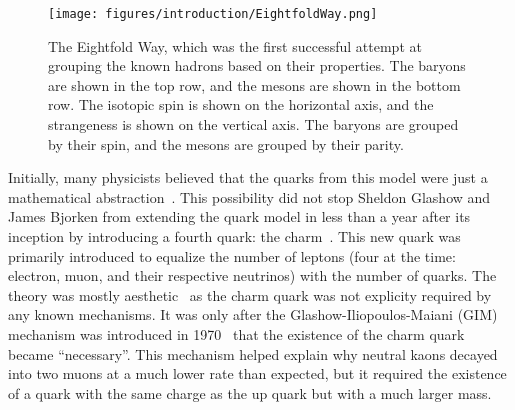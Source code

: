 \begin{figure}[ht]
    \centering
    \texttt{[image: figures/introduction/EightfoldWay.png]}
    \caption{The Eightfold Way, which was the first successful attempt at grouping the known hadrons based on their properties. The baryons are shown in the top row, and the mesons are shown in the bottom row. The isotopic spin is shown on the horizontal axis, and the strangeness is shown on the vertical axis. The baryons are grouped by their spin, and the mesons are grouped by their parity.}
    \label{fig:eightfold_way}
\end{figure}

Initially, many physicists believed that the quarks from this model were just a mathematical abstraction~\cite{QuarkAbstraction}. This possibility did not stop Sheldon Glashow and James Bjorken from extending the quark model in less than a year after its inception by introducing a fourth quark: the charm~\cite{CharmQuark}. This new quark was primarily introduced to equalize the number of leptons (four at the time: electron, muon, and their respective neutrinos) with the number of quarks. The theory was mostly aesthetic~\cite{AestheticCharm} as the charm quark was not explicity required by any known mechanisms. It was only after the Glashow-Iliopoulos-Maiani (GIM) mechanism was introduced in 1970~\cite{GIM} that the existence of the charm quark became ``necessary''. This mechanism helped explain why neutral kaons decayed into two muons at a much lower rate than expected, but it required the existence of a quark with the same charge as the up quark but with a much larger mass.

